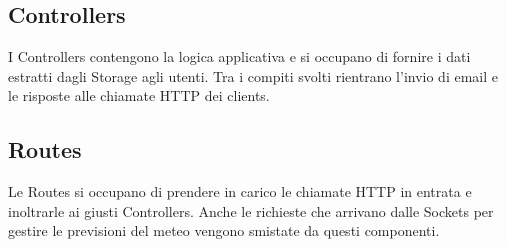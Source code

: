 \subsection{Controllers}
I Controllers contengono la logica applicativa e si occupano di fornire i dati estratti dagli Storage agli utenti. Tra i compiti svolti rientrano l'invio di email e le risposte alle chiamate HTTP dei clients.

\subsection{Routes}
Le Routes si occupano di prendere in carico le chiamate HTTP in entrata e inoltrarle ai giusti Controllers. Anche le richieste che arrivano dalle Sockets per gestire le previsioni del meteo vengono smistate da questi componenti.